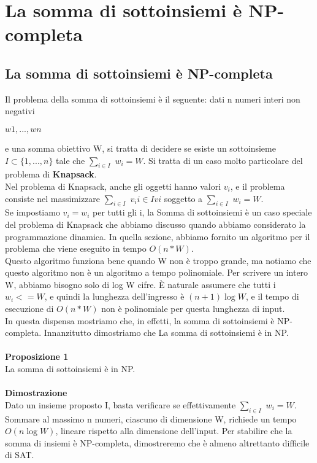 \chapter{La somma di sottoinsiemi è NP-completa} \label{ch:capitolo19}
\section{La somma di sottoinsiemi è NP-completa}
Il problema della somma di sottoinsiemi è il seguente: dati n numeri interi non negativi 
\begin{center}
    $w1,..., wn$
\end{center}
e una somma obiettivo W, si tratta di decidere se esiste un sottoinsieme $I \subset \{1,...,n\}$ tale che $\sum_{i\in I}$ $w_i = W$. Si tratta di un caso molto particolare del problema di \textbf{Knapsack}.
\\Nel problema di Knapsack, anche gli oggetti hanno valori $v_i$, e il problema consiste nel massimizzare $\sum_{i\in I}$ $v_ii \in I vi$ soggetto a $\sum_{i\in I}$ $w_i = W$. 
\\Se impostiamo $v_i = w_i$ per tutti gli i, la Somma di sottoinsiemi è un caso speciale del problema di Knapsack che abbiamo discusso quando abbiamo considerato la programmazione dinamica. In quella sezione, abbiamo fornito un algoritmo per il problema che viene eseguito in tempo $O(n*W)$.
\\Questo algoritmo funziona bene quando W non è troppo grande, ma notiamo che questo algoritmo non è un algoritmo a tempo polinomiale. Per scrivere un intero W, abbiamo bisogno solo di log W cifre. È naturale assumere che tutti i $w_i <= W$, e quindi la lunghezza dell'ingresso è $(n + 1) \log W$, e il tempo di esecuzione di $O(n*W)$ non è polinomiale per questa lunghezza di input.
\\In questa dispensa mostriamo che, in effetti, la somma di sottoinsiemi è NP-completa. Innanzitutto dimostriamo che
La somma di sottoinsiemi è in NP.\\\\
\textbf{Proposizione 1}
\\La somma di sottoinsiemi è in NP.\\\\
\textbf{Dimostrazione}\\ 
Dato un insieme proposto I, basta verificare se effettivamente  $\sum_{i\in I}$ $w_i = W$. Sommare al massimo n numeri, ciascuno di dimensione W, richiede un tempo $O(n \log W)$, lineare rispetto alla dimensione dell'input. Per stabilire che la somma di insiemi è NP-completa, dimostreremo che è almeno altrettanto difficile di SAT.
